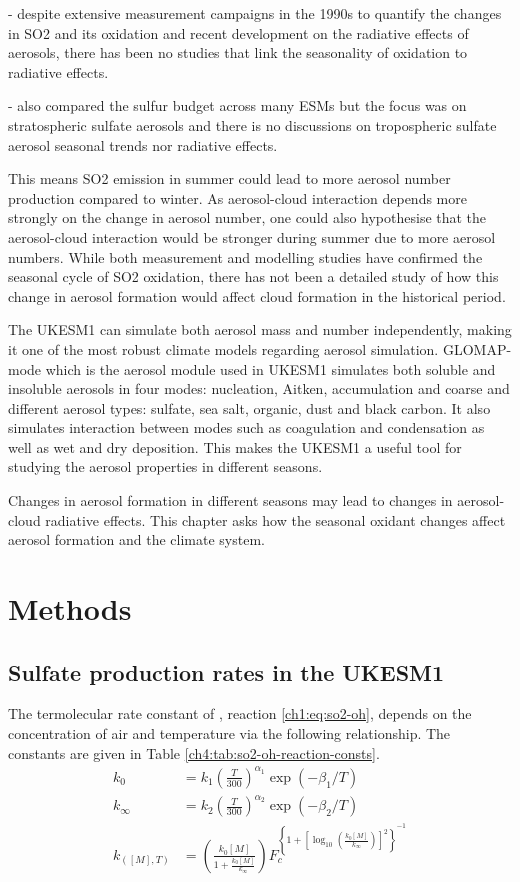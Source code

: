 - despite extensive measurement campaigns in the 1990s to quantify the changes in SO2 and its oxidation and recent development on the radiative effects of aerosols, there has been no studies that link the seasonality of oxidation to radiative effects.

- \citet{brodowskyAnalysisGlobalAtmospheric2024} also compared the sulfur budget across many ESMs but the focus was on stratospheric sulfate aerosols and there is no discussions on tropospheric sulfate aerosol seasonal trends nor radiative effects.

This means SO2 emission in summer could lead to more aerosol number production compared to winter. As aerosol-cloud interaction depends more strongly on the change in aerosol number, one could also hypothesise that the aerosol-cloud interaction would be stronger during summer due to more aerosol numbers. While both measurement and modelling studies have confirmed the seasonal cycle of SO2 oxidation, there has not been a detailed study of how this change in aerosol formation would affect cloud formation in the historical period. 

The UKESM1 can simulate both aerosol mass and number independently, making it one of the most robust climate models regarding aerosol simulation. GLOMAP-mode which is the aerosol module used in UKESM1 simulates both soluble and insoluble aerosols in four modes: nucleation, Aitken, accumulation and coarse and different aerosol types: sulfate, sea salt, organic, dust and black carbon. It also simulates interaction between modes such as coagulation and condensation as well as wet and dry deposition. This makes the UKESM1 a useful tool for studying the aerosol properties in different seasons.

Changes in aerosol formation in different seasons may lead to changes in aerosol-cloud radiative effects. This chapter asks how the seasonal oxidant changes affect aerosol formation and the climate system.



\section{Methods}

\subsection{Sulfate production rates in the UKESM1}
\label{ch4:sec:so4-prod-rate}
The termolecular rate constant of , reaction \ref{ch1:eq:so2-oh}, depends on the concentration of air and temperature via the following relationship. The constants are given in Table \ref{ch4:tab:so2-oh-reaction-consts}.
\begin{align}
    k_0 &= k_1 \left(\frac{T}{300}\right)^{\alpha_1} \exp{(-\beta_1/T)} \\
    k_\infty &= k_2 \left(\frac{T}{300}\right)^{\alpha_2} \exp{(-\beta_2/T)}\\
    k_{([M],T)} &= \left( \frac{k_0[M]}{1+\frac{k_0[M]}{k_\infty}}\right) F_c^{\left\{ 1+\left[ \log_{10} \left( \frac{k_0[M]}{k_\infty}\right) \right]^2 \right\}^{-1}} 
\end{align}


